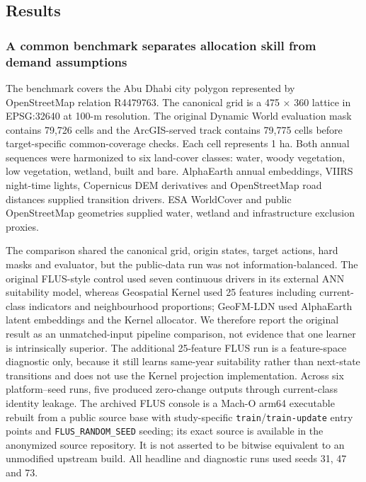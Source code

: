 \subsection{Results}\label{results}

\subsubsection{A common benchmark separates allocation skill from demand
assumptions}\label{a-common-benchmark-separates-allocation-skill-from-demand-assumptions}

The benchmark covers the Abu Dhabi city polygon represented by
OpenStreetMap relation R4479763. The canonical grid is a 475 × 360
lattice in EPSG:32640 at 100-m resolution. The original Dynamic World
evaluation mask contains 79,726 cells and the ArcGIS-served track
contains 79,775 cells before target-specific common-coverage checks.
Each cell represents 1 ha. Both annual sequences were harmonized to six
land-cover classes: water, woody vegetation, low vegetation, wetland,
built and bare. AlphaEarth annual embeddings, VIIRS night-time lights,
Copernicus DEM derivatives and OpenStreetMap road distances supplied
transition drivers. ESA WorldCover and public OpenStreetMap geometries
supplied water, wetland and infrastructure exclusion proxies.

The comparison shared the canonical grid, origin states, target actions,
hard masks and evaluator, but the public-data run was not
information-balanced. The original FLUS-style control used seven
continuous drivers in its external ANN suitability model, whereas
Geospatial Kernel used 25 features including current-class indicators
and neighbourhood proportions; GeoFM-LDN used AlphaEarth latent
embeddings and the Kernel allocator. We therefore report the original
result as an unmatched-input pipeline comparison, not evidence that one
learner is intrinsically superior. The additional 25-feature FLUS run is
a feature-space diagnostic only, because it still learns same-year
suitability rather than next-state transitions and does not use the
Kernel projection implementation. Across six platform--seed runs, five
produced zero-change outputs through current-class identity leakage. The
archived FLUS console is a Mach-O arm64 executable rebuilt from a public
source base with study-specific \texttt{train}/\texttt{train-update}
entry points and \texttt{FLUS\_RANDOM\_SEED} seeding; its exact source
is available in the anonymized source repository. It is not asserted to
be bitwise equivalent to an unmodified upstream build. All headline and
diagnostic runs used seeds 31, 47 and 73.

